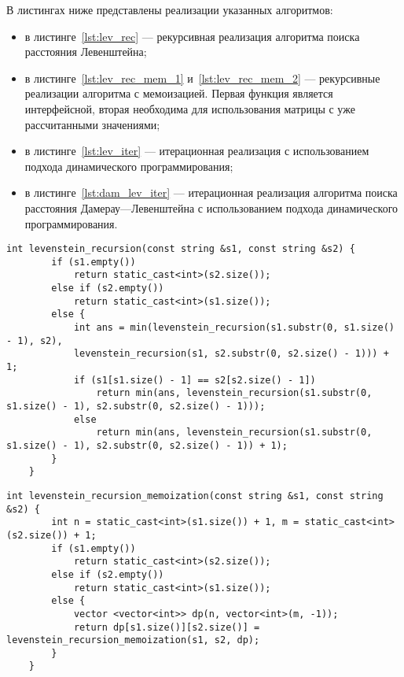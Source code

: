 В листингах ниже представлены реализации указанных алгоритмов:
\begin{itemize}[label=---]
	\item в листинге~\ref{lst:lev_rec} --- рекурсивная реализация алгоритма поиска расстояния Левенштейна;
	\item в листинге~\ref{lst:lev_rec_mem_1} и~\ref{lst:lev_rec_mem_2} --- рекурсивные реализации алгоритма с мемоизацией. Первая функция является интерфейсной, вторая необходима для использования матрицы с уже рассчитанными значениями;
	\item в листинге~\ref{lst:lev_iter} --- итерационная реализация с использованием подхода динамического программирования;
	\item в листинге~\ref{lst:dam_lev_iter} --- итерационная реализация алгоритма поиска расстояния Дамерау---Левенштейна с использованием подхода динамического программирования.
\end{itemize}
\clearpage
\begin{lstlisting}[caption={Рекурсивная функция поиска расстояния Левенштейна}, label=lst:lev_rec]
	int levenstein_recursion(const string &s1, const string &s2) {
		if (s1.empty())
			return static_cast<int>(s2.size());
		else if (s2.empty())
			return static_cast<int>(s1.size());
		else {
			int ans = min(levenstein_recursion(s1.substr(0, s1.size() - 1), s2),
			levenstein_recursion(s1, s2.substr(0, s2.size() - 1))) + 1;
			if (s1[s1.size() - 1] == s2[s2.size() - 1])
				return min(ans, levenstein_recursion(s1.substr(0, s1.size() - 1), s2.substr(0, s2.size() - 1)));
			else
				return min(ans, levenstein_recursion(s1.substr(0, s1.size() - 1), s2.substr(0, s2.size() - 1)) + 1);
		}
	}
\end{lstlisting}
\begin{lstlisting}[caption={Вызываемая функция рекурсивного поиска расстояния Левенштейна с мемоизацией}, label=lst:lev_rec_mem_1]
	int levenstein_recursion_memoization(const string &s1, const string &s2) {
		int n = static_cast<int>(s1.size()) + 1, m = static_cast<int>(s2.size()) + 1;
		if (s1.empty())
			return static_cast<int>(s2.size());
		else if (s2.empty())
			return static_cast<int>(s1.size());
		else {
			vector <vector<int>> dp(n, vector<int>(m, -1));
			return dp[s1.size()][s2.size()] = levenstein_recursion_memoization(s1, s2, dp);
		}
	}
\end{lstlisting}
